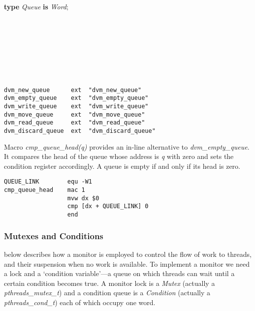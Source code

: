 \begin{tabbing}
\indents
\vb\>\textbf{type} \emph{Queue} \textbf{is} \emph{Word};\\
\\[-10pt]
\\[-10pt]
\\[-10pt]
\\[-10pt]
\\[-10pt]
\\[-10pt]
\\[-30pt]
\end{tabbing}

{\small
\begin{verbatim}
dvm_new_queue      ext  "dvm_new_queue"
dvm_empty_queue    ext  "dvm_empty_queue"
dvm_write_queue    ext  "dvm_write_queue"
dvm_move_queue     ext  "dvm_move_queue"
dvm_read_queue     ext  "dvm_read_queue"
dvm_discard_queue  ext  "dvm_discard_queue"
\end{verbatim}}

Macro \emph{cmp\_queue\_head(q)} provides an in-line alternative to \emph{dvm\_empty\_queue}. It compares the head of the queue whose address is \emph{q} with zero and sets the condition register accordingly. A queue is empty if and only if its head is zero.

{\small
\begin{verbatim}
QUEUE_LINK        equ -W1
cmp_queue_head    mac 1
                  mvw dx $0
                  cmp [dx + QUEUE_LINK] 0
                  end
\end{verbatim}}




\subsubsection{Mutexes and Conditions}
 below describes how a monitor is employed to control the flow of work to threads, and their suspension when no work is available. To implement a monitor we need a lock and a `condition variable'---a queue on which threads can wait until a certain condition becomes true. A monitor lock is a \emph{Mutex} (actually a \emph{pthreads\_mutex\_t}) and a condition queue is a \emph{Condition} (actually a \emph{pthreads\_cond\_t}) each of which occupy one word.


